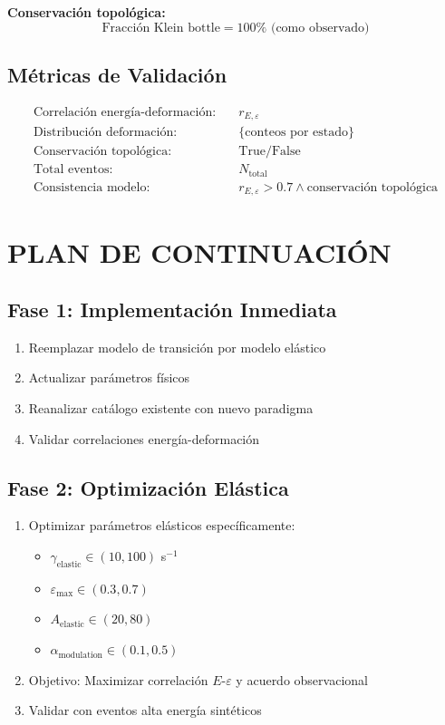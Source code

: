 \documentclass[12pt,a4paper]{article}
\begin{document}
\textbf{Conservación topológica:}
\begin{equation}
\text{Fracción Klein bottle} = 100\% \text{ (como observado)}
\end{equation}

\subsection{Métricas de Validación}

\begin{align}
\text{Correlación energía-deformación:} &\quad r_{E,\varepsilon}\\
\text{Distribución deformación:} &\quad \{\text{conteos por estado}\}\\
\text{Conservación topológica:} &\quad \text{True/False}\\
\text{Total eventos:} &\quad N_{\text{total}}\\
\text{Consistencia modelo:} &\quad r_{E,\varepsilon} > 0.7 \land \text{conservación topológica}
\end{align}

\section{PLAN DE CONTINUACIÓN}

\subsection{Fase 1: Implementación Inmediata}

\begin{enumerate}
\item Reemplazar modelo de transición por modelo elástico
\item Actualizar parámetros físicos
\item Reanalizar catálogo existente con nuevo paradigma
\item Validar correlaciones energía-deformación
\end{enumerate}

\subsection{Fase 2: Optimización Elástica}

\begin{enumerate}
\item Optimizar parámetros elásticos específicamente:
\begin{itemize}
\item $\gamma_{\text{elastic}} \in (10, 100)$ s$^{-1}$
\item $\varepsilon_{\max} \in (0.3, 0.7)$
\item $A_{\text{elastic}} \in (20, 80)$
\item $\alpha_{\text{modulation}} \in (0.1, 0.5)$
\end{itemize}
\item Objetivo: Maximizar correlación $E$-$\varepsilon$ y acuerdo observacional
\item Validar con eventos alta energía sintéticos
\end{enumerate}
\end{document}

